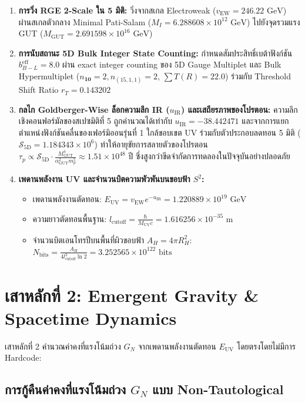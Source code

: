 \documentclass[11pt, a4paper]{article}
\begin{document}
\begin{enumerate}
    \item \textbf{การวิ่ง RGE 2-Scale ใน 5 มิติ:} วิ่งจากสเกล Electroweak ($v_{\text{EW}} = 246.22\text{ GeV}$) ผ่านสเกลตัวกลาง Minimal Pati-Salam ($M_I = 6.288608 \times 10^{12}\text{ GeV}$) ไปยังจุดรวมแรง GUT ($M_{\text{GUT}} = 2.691598 \times 10^{16}\text{ GeV}$)
    \item \textbf{การนับสถานะ 5D Bulk Integer State Counting:} กำหนดสัมประสิทธิ์เบต้าฟังก์ชัน $b_{B-L}^{\text{eff}} = 8.0$ ผ่าน exact integer counting ของ 5D Gauge Multiplet และ Bulk Hypermultiplet ($n_{\mathbf{10}} = 2, n_{(15,1,1)} = 2$, $\sum T(R) = 22.0$) ร่วมกับ Threshold Shift Ratio $r_T = 0.143202$
    \item \textbf{กลไก Goldberger-Wise ล็อกความลึก IR ($u_{\text{IR}}$) และเสถียรภาพของโปรตอน:} ความลึกเชิงคอนฟอร์มัลของสเปซมิติที่ 5 ถูกคำนวณได้เท่ากับ $u_{\text{IR}} = -38.442471$ และจากการแยกตำแหน่งฟังก์ชันคลื่นของเฟอร์มิออนรุ่นที่ 1 ใกล้ขอบเขต UV ร่วมกับตัวประกอบลดทอน 5 มิติ ($\mathcal{S}_{5\text{D}} = 1.184343 \times 10^6$) ทำให้อายุขัยการสลายตัวของโปรตอน $\tau_p \propto \mathcal{S}_{5\text{D}} \cdot \frac{M_{\text{GUT}}^4}{\alpha_{\text{GUT}}^2 m_p^5} \approx 1.51 \times 10^{48}$ ปี ซึ่งสูงกว่าขีดจำกัดการทดลองในปัจจุบันอย่างปลอดภัย
    \item \textbf{เพดานพลังงาน UV และจำนวนบิตความพัวพันบนขอบฟ้า $S^2$:}
    \begin{itemize}
        \item เพดานพลังงานตัดทอน: $E_{\text{UV}} = v_{\text{EW}} e^{-u_{\text{IR}}} = 1.220889 \times 10^{19}\text{ GeV}$
        \item ความยาวตัดทอนพื้นฐาน: $l_{\text{cutoff}} = \frac{\hbar}{M_{\text{UV}} c} = 1.616256 \times 10^{-35}\text{ m}$
        \item จำนวนบิตเอนโทรปีบนพื้นที่ผิวขอบฟ้า $A_H = 4\pi R_H^2$: $N_{\text{bits}} = \frac{A_H}{4 l_{\text{cutoff}}^2 \ln 2} = 3.252565 \times 10^{122}\text{ bits}$
    \end{itemize}
\end{enumerate}

\section{เสาหลักที่ 2: Emergent Gravity \& Spacetime Dynamics}

เสาหลักที่ 2 คำนวณค่าคงที่แรงโน้มถ่วง $G_N$ จากเพดานพลังงานตัดทอน $E_{\text{UV}}$ โดยตรงโดยไม่มีการ Hardcode:

\subsection{การกู้คืนค่าคงที่แรงโน้มถ่วง $G_N$ แบบ Non-Tautological}
\end{document}
